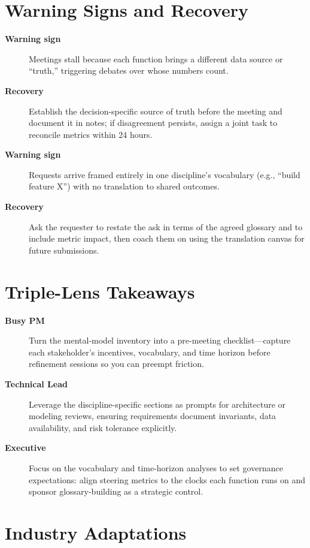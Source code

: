 \section{Warning Signs and Recovery}
\label{sec:translation-warning}
\begin{description}
    \item[\textbf{Warning sign}] Meetings stall because each function brings a different data source or ``truth,'' triggering debates over whose numbers count.
    \item[\textbf{Recovery}] Establish the decision-specific source of truth before the meeting and document it in notes; if disagreement persists, assign a joint task to reconcile metrics within 24 hours.
    \item[\textbf{Warning sign}] Requests arrive framed entirely in one discipline's vocabulary (e.g., ``build feature X'') with no translation to shared outcomes.
    \item[\textbf{Recovery}] Ask the requester to restate the ask in terms of the agreed glossary and to include metric impact, then coach them on using the translation canvas for future submissions.
\end{description}

\section{Triple-Lens Takeaways}
\label{sec:translation-triple}

\begin{description}
    \item[\textbf{Busy PM}] Turn the mental-model inventory into a pre-meeting checklist—capture each stakeholder's incentives, vocabulary, and time horizon before refinement sessions so you can preempt friction.
    \item[\textbf{Technical Lead}] Leverage the discipline-specific sections as prompts for architecture or modeling reviews, ensuring requirements document invariants, data availability, and risk tolerance explicitly.
    \item[\textbf{Executive}] Focus on the vocabulary and time-horizon analyses to set governance expectations: align steering metrics to the clocks each function runs on and sponsor glossary-building as a strategic control.
\end{description}
\section{Industry Adaptations}
\label{sec:translation-industry}
